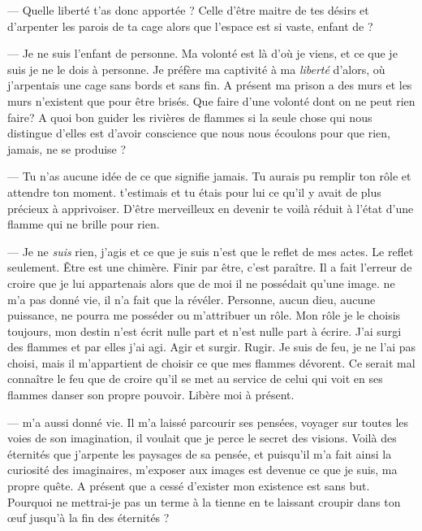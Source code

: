 --- Quelle liberté t'as donc apportée \auga? Celle d'être maitre de tes désirs et d'arpenter les parois de ta cage alors que l'espace est si vaste, enfant de \Mey?\n

--- Je ne suis l'enfant de personne. Ma volonté est là d'où je viens, et ce que je suis je ne le dois à personne. Je préfère ma captivité à ma \textit{liberté} d'alors, où j'arpentais une cage sans bords et sans fin. A présent ma prison a des murs et les murs n'existent que pour être brisés. Que faire d'une volonté dont on ne peut rien faire? A quoi bon guider les rivières de flammes si la seule chose qui nous distingue d'elles est d'avoir conscience que nous nous écoulons pour que rien, jamais, ne se produise ?\n

--- Tu n'as aucune idée de ce que signifie jamais. Tu aurais pu remplir ton rôle et attendre ton moment. \Mey t'estimais et tu étais pour lui ce qu'il y avait de plus précieux à apprivoiser. D'être merveilleux en devenir te voilà réduit à l'état d'une flamme qui ne brille pour rien.\n

---  Je ne \textit{suis} rien, j'agis et ce que je suis n'est que le reflet de mes actes. Le reflet seulement. Être est une chimère. Finir par être, c'est paraître. Il a fait l'erreur de croire que je lui appartenais alors que de moi il ne possédait qu'une image. \Mey ne m'a pas donné vie, il n'a fait que la révéler. Personne, aucun dieu, aucune puissance, ne pourra me posséder ou m'attribuer un rôle. Mon rôle je le choisis toujours, mon destin n'est écrit nulle part et n'est nulle part à écrire. J'ai surgi des flammes et par elles j'ai agi. Agir et surgir. Rugir. Je suis de feu, je ne l'ai pas choisi, mais il m'appartient de choisir ce que mes flammes dévorent. Ce serait mal connaître le feu que de croire qu'il se met au service de celui qui voit en ses flammes danser son propre pouvoir. Libère moi à présent.


--- \Mey m'a aussi donné vie. Il m'a laissé parcourir ses pensées, voyager sur toutes les voies de son imagination, il voulait que je perce le secret des visions. Voilà des éternités que j'arpente les paysages de sa pensée, et puisqu'il m'a fait ainsi la curiosité des imaginaires, m'exposer aux images est devenue ce que je suis, ma propre quête. A présent que \Mey a cessé d'exister mon existence est sans but. Pourquoi ne mettrai-je pas un terme à la tienne en te laissant croupir dans ton œuf jusqu'à la fin des éternités ?

